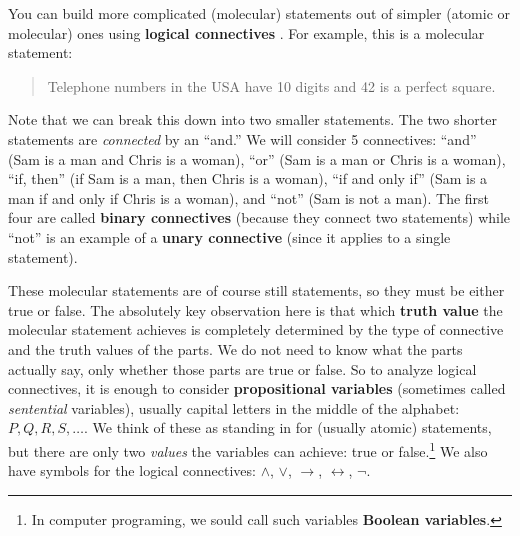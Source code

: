\documentclass[10pt,]{book}
\newcommand{\terminology}[1]{\textbf{#1}}
\theoremstyle{plain}
\theoremstyle{definition}
\theoremstyle{definition}
\theoremstyle{definition}
\theoremstyle{definition}
\numberwithin{equation}{chapter}
\def\iff{\leftrightarrow}
\def\imp{\rightarrow}
\begin{document}
\par
\hypertarget{p-1259}{}%
You can build more complicated (molecular) statements out of simpler (atomic or molecular) ones using \terminology{logical connectives} . For example, this is a molecular statement:%
\begin{quote}\hypertarget{blockquote-4}{}
\hypertarget{p-1260}{}%
Telephone numbers in the USA have 10 digits and 42 is a perfect square.%
\end{quote}
\hypertarget{p-1261}{}%
Note that we can break this down into two smaller statements. The two shorter statements are \emph{connected} by an ``and.'' We will consider 5 connectives: ``and'' (Sam is a man and Chris is a woman), ``or'' (Sam is a man or Chris is a woman), ``if\textellipsis{}, then\textellipsis{}'' (if Sam is a man, then Chris is a woman), ``if and only if'' (Sam is a man if and only if Chris is a woman), and ``not'' (Sam is not a man). The first four are called \terminology{binary connectives} (because they connect two statements) while ``not'' is an example of a \terminology{unary connective} (since it applies to a single statement).%
\par
\hypertarget{p-1262}{}%
These molecular statements are of course still statements, so they must be either true or false.  The absolutely key observation here is that which \terminology{truth value}  the molecular statement achieves is completely determined by the type of connective and the truth values of the parts. We do not need to know what the parts actually say, only whether those parts are true or false. So to analyze logical connectives, it is enough to consider \terminology{propositional variables} (sometimes called \emph{sentential} variables), usually capital letters in the middle of the alphabet: \(P, Q, R, S, \ldots\).  We think of these as standing in for (usually atomic) statements, but there are only two \emph{values} the variables can achieve: true or false.\footnote{In computer programing, we sould call such variables \terminology{Boolean variables}.\label{fn-9}} \label{notation-9}
 We also have symbols for the logical connectives: \(\wedge\), \(\vee\), \(\imp\), \(\iff\), \(\neg\).%
\end{document}
